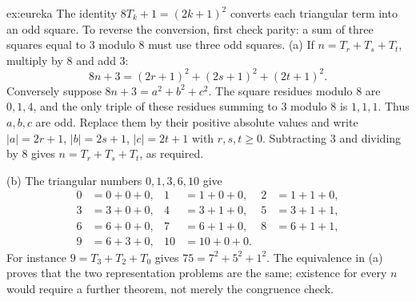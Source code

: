 \begin{solution}{ex:eureka}
\idea The identity $8T_k+1=(2k+1)^2$ converts each triangular term into an odd square. To reverse the conversion, first check parity: a sum of three squares equal to $3$ modulo $8$ must use three odd squares.
\writeup (a) If $n=T_r+T_s+T_t$, multiply by $8$ and add $3$:
\[
8n+3=(2r+1)^2+(2s+1)^2+(2t+1)^2.
\]
Conversely suppose $8n+3=a^2+b^2+c^2$. The square residues modulo $8$ are $0,1,4$, and the only triple of these residues summing to $3$ modulo $8$ is $1,1,1$. Thus $a,b,c$ are odd. Replace them by their positive absolute values and write $|a|=2r+1$, $|b|=2s+1$, $|c|=2t+1$ with $r,s,t\ge0$. Subtracting $3$ and dividing by $8$ gives $n=T_r+T_s+T_t$, as required.

(b) The triangular numbers $0,1,3,6,10$ give
\[
\begin{aligned}
0&=0+0+0,&1&=1+0+0,&2&=1+1+0,\\
3&=3+0+0,&4&=3+1+0,&5&=3+1+1,\\
6&=6+0+0,&7&=6+1+0,&8&=6+1+1,\\
9&=6+3+0,&10&=10+0+0.
\end{aligned}
\]
For instance $9=T_3+T_2+T_0$ gives $75=7^2+5^2+1^2$. The equivalence in (a) proves that the two representation problems are the same; existence for every $n$ would require a further theorem, not merely the congruence check.
\end{solution}

